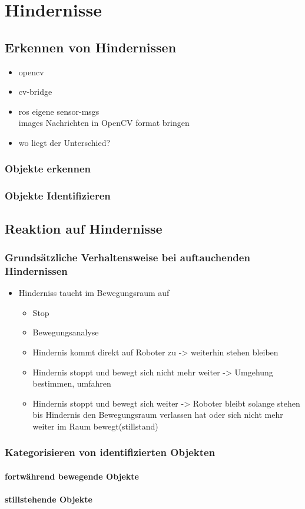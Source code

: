 \chapter{Hindernisse}
	\section{Erkennen von Hindernissen}
		\begin{itemize}
		\item opencv
		\item cv-bridge
		\item ros eigene sensor-msgs\\images Nachrichten in OpenCV format bringen
		\item wo liegt der Unterschied?
		\end{itemize}
		\subsection{Objekte erkennen}
		\subsection{Objekte Identifizieren}
	\section{Reaktion auf Hindernisse}
		\subsection{Grundsätzliche Verhaltensweise bei auftauchenden Hindernissen}
		\begin{itemize}
		\item Hinderniss taucht im Bewegungsraum auf
			\begin{itemize}
				\item Stop
				\item Bewegungsanalyse
				\item Hindernis kommt direkt auf Roboter zu -> weiterhin stehen bleiben
				\item Hindernis stoppt und bewegt sich nicht mehr weiter -> Umgehung bestimmen, umfahren
				\item Hindernis stoppt und bewegt sich weiter -> Roboter bleibt solange stehen bis Hindernis den Bewegungsraum verlassen hat oder sich nicht mehr weiter im Raum bewegt(stillstand) 
			\end{itemize}
		\end{itemize}
		\subsection{Kategorisieren von identifizierten Objekten}
			\subsubsection{fortwährend bewegende Objekte}
			\subsubsection{stillstehende Objekte}